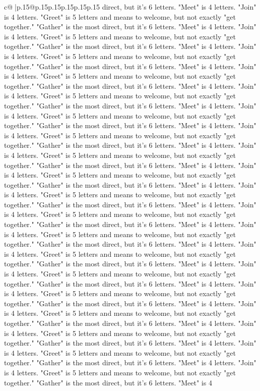 \documentclass{article}
\begin{document}
{\begin{supertabular}{c@{$\;$}|p{.15\linewidth}@{}p{.15\linewidth}p{.15\linewidth}p{.15\linewidth}p{.15\linewidth}p{.15\linewidth}}
{{{direct, but it's 6 letters. "Meet" is 4 letters. "Join" is 4 letters. "Greet" is 5 letters and means to welcome, but not exactly "get together." "Gather" is the most direct, but it's 6 letters. "Meet" is 4 letters. "Join" is 4 letters. "Greet" is 5 letters and means to welcome, but not exactly "get together." "Gather" is the most direct, but it's 6 letters. "Meet" is 4 letters. "Join" is 4 letters. "Greet" is 5 letters and means to welcome, but not exactly "get together." "Gather" is the most direct, but it's 6 letters. "Meet" is 4 letters. "Join" is 4 letters. "Greet" is 5 letters and means to welcome, but not exactly "get together." "Gather" is the most direct, but it's 6 letters. "Meet" is 4 letters. "Join" is 4 letters. "Greet" is 5 letters and means to welcome, but not exactly "get together." "Gather" is the most direct, but it's 6 letters. "Meet" is 4 letters. "Join" is 4 letters. "Greet" is 5 letters and means to welcome, but not exactly "get together." "Gather" is the most direct, but it's 6 letters. "Meet" is 4 letters. "Join" is 4 letters. "Greet" is 5 letters and means to welcome, but not exactly "get together." "Gather" is the most direct, but it's 6 letters. "Meet" is 4 letters. "Join" is 4 letters. "Greet" is 5 letters and means to welcome, but not exactly "get together." "Gather" is the most direct, but it's 6 letters. "Meet" is 4 letters. "Join" is 4 letters. "Greet" is 5 letters and means to welcome, but not exactly "get together." "Gather" is the most direct, but it's 6 letters. "Meet" is 4 letters. "Join" is 4 letters. "Greet" is 5 letters and means to welcome, but not exactly "get together." "Gather" is the most direct, but it's 6 letters. "Meet" is 4 letters. "Join" is 4 letters. "Greet" is 5 letters and means to welcome, but not exactly "get together." "Gather" is the most direct, but it's 6 letters. "Meet" is 4 letters. "Join" is 4 letters. "Greet" is 5 letters and means to welcome, but not exactly "get together." "Gather" is the most direct, but it's 6 letters. "Meet" is 4 letters. "Join" is 4 letters. "Greet" is 5 letters and means to welcome, but not exactly "get together." "Gather" is the most direct, but it's 6 letters. "Meet" is 4 letters. "Join" is 4 letters. "Greet" is 5 letters and means to welcome, but not exactly "get together." "Gather" is the most direct, but it's 6 letters. "Meet" is 4 letters. "Join" is 4 letters. "Greet" is 5 letters and means to welcome, but not exactly "get together." "Gather" is the most direct, but it's 6 letters. "Meet" is 4 letters. "Join" is 4 letters. "Greet" is 5 letters and means to welcome, but not exactly "get together." "Gather" is the most direct, but it's 6 letters. "Meet" is 4 letters. "Join" is 4 letters. "Greet" is 5 letters and means to welcome, but not exactly "get together." "Gather" is the most direct, but it's 6 letters. "Meet" is 4 letters. "Join" is 4 letters. "Greet" is 5 letters and means to welcome, but not exactly "get together." "Gather" is the most direct, but it's 6 letters. "Meet" is 4 letters. "Join" is 4 letters. "Greet" is 5 letters and means to welcome, but not exactly "get together." "Gather" is the most direct, but it's 6 letters. "Meet" is 4 }}}
\end{supertabular}}
\end{document}
